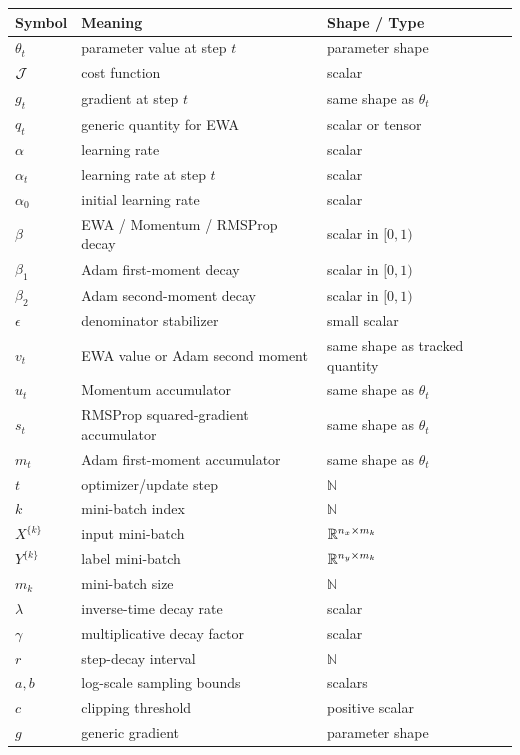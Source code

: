 \begin{center}
\begin{tabular}{lll}
\toprule
Symbol & Meaning & Shape / Type \\
\midrule
$\theta_t$ & parameter value at step $t$ & parameter shape \\
$\mathcal{J}$ & cost function & scalar \\
$g_t$ & gradient at step $t$ & same shape as $\theta_t$ \\
$q_t$ & generic quantity for EWA & scalar or tensor \\
$\alpha$ & learning rate & scalar \\
$\alpha_t$ & learning rate at step $t$ & scalar \\
$\alpha_0$ & initial learning rate & scalar \\
$\beta$ & EWA / Momentum / RMSProp decay & scalar in $[0,1)$ \\
$\beta_1$ & Adam first-moment decay & scalar in $[0,1)$ \\
$\beta_2$ & Adam second-moment decay & scalar in $[0,1)$ \\
$\epsilon$ & denominator stabilizer & small scalar \\
$v_t$ & EWA value or Adam second moment & same shape as tracked quantity \\
$u_t$ & Momentum accumulator & same shape as $\theta_t$ \\
$s_t$ & RMSProp squared-gradient accumulator & same shape as $\theta_t$ \\
$m_t$ & Adam first-moment accumulator & same shape as $\theta_t$ \\
$t$ & optimizer/update step & $\mathbb{N}$ \\
$k$ & mini-batch index & $\mathbb{N}$ \\
$X^{\{k\}}$ & input mini-batch & $\mathbb{R}^{n_x \times m_k}$ \\
$Y^{\{k\}}$ & label mini-batch & $\mathbb{R}^{n_y \times m_k}$ \\
$m_k$ & mini-batch size & $\mathbb{N}$ \\
$\lambda$ & inverse-time decay rate & scalar \\
$\gamma$ & multiplicative decay factor & scalar \\
$r$ & step-decay interval & $\mathbb{N}$ \\
$a,b$ & log-scale sampling bounds & scalars \\
$c$ & clipping threshold & positive scalar \\
$g$ & generic gradient & parameter shape \\
\bottomrule
\end{tabular}
\end{center}
